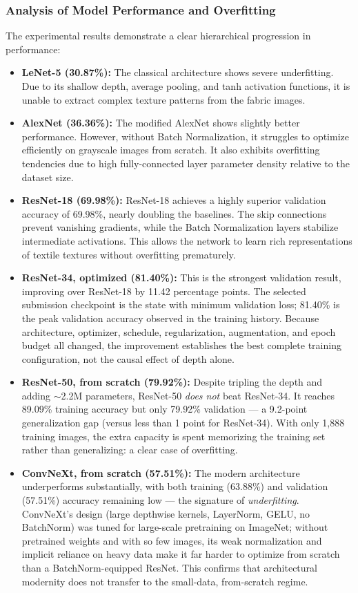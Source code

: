 \documentclass{name}
\begin{document}
\subsubsection{Analysis of Model Performance and Overfitting}
The experimental results demonstrate a clear hierarchical progression in performance:
\begin{itemize}
    \item \textbf{LeNet-5 (30.87\%):} The classical architecture shows severe underfitting. Due to its shallow depth, average pooling, and tanh activation functions, it is unable to extract complex texture patterns from the fabric images.
    \item \textbf{AlexNet (36.36\%):} The modified AlexNet shows slightly better performance. However, without Batch Normalization, it struggles to optimize efficiently on grayscale images from scratch. It also exhibits overfitting tendencies due to high fully-connected layer parameter density relative to the dataset size.
    \item \textbf{ResNet-18 (69.98\%):} ResNet-18 achieves a highly superior validation accuracy of 69.98\%, nearly doubling the baselines. The skip connections prevent vanishing gradients, while the Batch Normalization layers stabilize intermediate activations. This allows the network to learn rich representations of textile textures without overfitting prematurely.
    \item \textbf{ResNet-34, optimized (81.40\%):} This is the strongest validation result, improving over ResNet-18 by 11.42 percentage points. The selected submission checkpoint is the state with minimum validation loss; 81.40\% is the peak validation accuracy observed in the training history. Because architecture, optimizer, schedule, regularization, augmentation, and epoch budget all changed, the improvement establishes the best complete training configuration, not the causal effect of depth alone.
    \item \textbf{ResNet-50, from scratch (79.92\%):} Despite tripling the depth and adding $\sim$2.2M parameters, ResNet-50 \emph{does not} beat ResNet-34. It reaches 89.09\% training accuracy but only 79.92\% validation --- a 9.2-point generalization gap (versus less than 1 point for ResNet-34). With only 1,888 training images, the extra capacity is spent memorizing the training set rather than generalizing: a clear case of overfitting.
    \item \textbf{ConvNeXt, from scratch (57.51\%):} The modern architecture underperforms substantially, with both training (63.88\%) and validation (57.51\%) accuracy remaining low --- the signature of \emph{underfitting}. ConvNeXt's design (large depthwise kernels, LayerNorm, GELU, no BatchNorm) was tuned for large-scale pretraining on ImageNet; without pretrained weights and with so few images, its weak normalization and implicit reliance on heavy data make it far harder to optimize from scratch than a BatchNorm-equipped ResNet. This confirms that architectural modernity does not transfer to the small-data, from-scratch regime.
\end{itemize}
\end{document}
